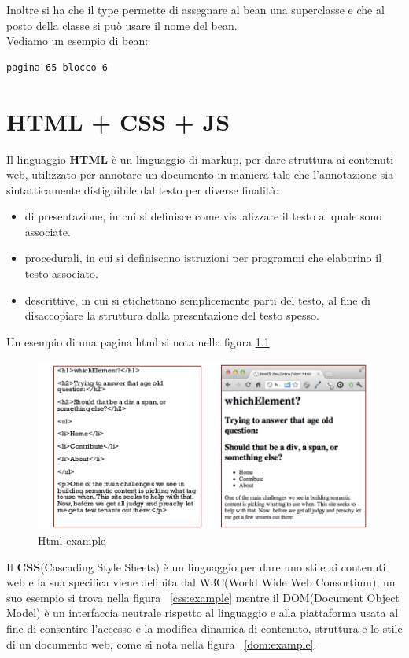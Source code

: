 \documentclass[a4paper,12pt, oneside]{book}
\begin{document}
Inoltre si ha che il type permette di assegnare al bean una superclasse e che al posto della classe si può usare il nome del bean.\\
Vediamo un esempio di bean:
\begin{verbatim}
pagina 65 blocco 6
\end{verbatim} 














\chapter{HTML + CSS + JS}
Il linguaggio \textbf{HTML} è un linguaggio di markup, per dare struttura ai contenuti web,
utilizzato per annotare un documento in maniera tale che l'annotazione sia sintatticamente
distiguibile dal testo per diverse finalità:
\begin{itemize}
    \item di presentazione, in cui si definisce come visualizzare il testo al quale sono associate.
    \item procedurali, in cui si definiscono istruzioni per programmi che elaborino il testo associato.
    \item descrittive, in cui si etichettano semplicemente parti del testo, 
        al fine di disaccopiare la struttura dalla presentazione del testo spesso.
\end{itemize}
Un esempio di una pagina html si nota nella figura \ref{listato:htmlExample}

\begin{figure}
    \caption{Html example}
    \label{listato:htmlExample}
	\includegraphics[scale=0.9]{img/html.png}
\end{figure}
Il \textbf{CSS}(Cascading Style Sheets) è un linguaggio per dare uno stile ai contenuti web e la sua specifica
viene definita dal W3C(World Wide Web Consortium), un suo esempio si trova nella figura ~\ref{css:example}
mentre il DOM(Document Object Model) è un interfaccia neutrale rispetto al linguaggio e alla piattaforma
usata al fine di consentire l'accesso e la modifica dinamica di contenuto, struttura e lo stile di un
documento web, come si nota nella figura ~\ref{dom:example}.
\end{document}
